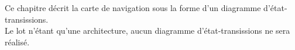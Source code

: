 
Ce chapitre décrit la carte de navigation sous la forme d'un diagramme d'état-transissions. \\

Le lot n'étant qu'une architecture, aucun diagramme d'état-transissions ne sera réalisé.